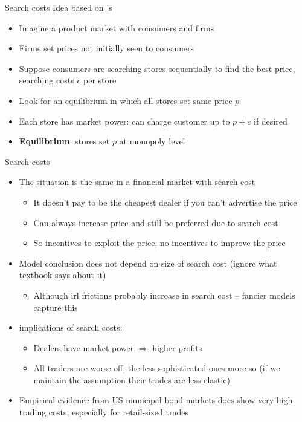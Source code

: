 \documentclass[english,10pt
,aspectratio=169
]{beamer}
\begin{document}
\begin{frame}{Search costs}
	Idea based on \cite{diamond_model_1971}'s 
	\begin{itemize}
		\item Imagine a product market with consumers and firms
		\item Firms set prices not initially seen to consumers
		\item Suppose consumers are searching stores sequentially to find the best price, searching costs $c$ per store
		\item Look for an equilibrium in which all stores set same price $p$
		\item Each store has market power: can charge customer up to $p+c$ if desired
		\item \textbf{Equilibrium}: stores set $p$ at monopoly level
	\end{itemize}
\end{frame}


\begin{frame}{Search costs}
	\begin{itemize}
		\item The situation is the same in a financial market with search cost
		\begin{itemize}
			\item It doesn't pay to be the cheapest dealer if you can't advertise the price
			\item Can always increase price and still be preferred due to search cost
			\item So incentives to exploit the price, no incentives to improve the price
		\end{itemize}
		\item Model conclusion does not depend on size of search cost (ignore what textbook says about it)
		\begin{itemize}
			\item Although irl frictions probably increase in search cost -- fancier models capture this
		\end{itemize}
		\item {} implications of search costs:
		\begin{itemize}
			\item \alert{Dealers} have market power $\Rightarrow$ \alert{higher profits}
			\item All \alert{traders are worse off}, the less sophisticated ones more so (if we maintain the assumption their trades are less elastic)
		\end{itemize}
		\item Empirical evidence from US municipal bond markets does show very high trading costs, especially for retail-sized trades \citep{harris_secondary_2006,green_financial_2007}
	\end{itemize}
\end{frame}
\end{document}
